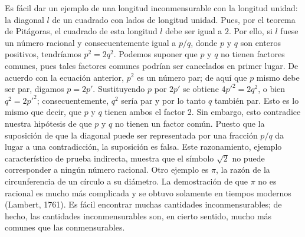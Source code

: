 \documentclass[12pt]{book}
\theoremstyle{definition}
\begin{document}
Es fácil dar un ejemplo de una longitud inconmensurable con la longitud unidad: la diagonal $l$ de un cuadrado con lados de longitud unidad. Pues, por el teorema de Pitágoras, el cuadrado de esta longitud $l$ debe ser igual a $2$. Por ello, si $l$ fuese un número racional y consecuentemente igual a $p/q$, donde $p$ y $q$ son enteros positivos, tendríamos $p^2 = 2q^2$. Podemos suponer que $p$ y $q$ no tienen factores comunes, pues tales factores comunes podrían ser cancelados en primer lugar. De acuerdo con la ecuación anterior, $p^2$ es un número par; de aquí que $p$ mismo debe ser par, digamos $p = 2p'$. Sustituyendo $p$ por $2p'$ se obtiene $4p'^2 = 2q^2$, o bien $q^2 = 2p'^2$; consecuentemente, $q^2$ sería par y por lo tanto $q$ también par. Esto es lo mismo que decir, que $p$ y $q$ tienen ambos el factor $2$. Sin embargo, esto contradice nuestra hipótesis de que $p$ y $q$ no tienen un factor común. Puesto que la suposición de que la diagonal puede ser representada por una fracción $p/q$ da lugar a una contradicción, la suposición es falsa. Este razonamiento, ejemplo característico de prueba indirecta, muestra que el símbolo $\sqrt{2}$ no puede corresponder a ningún número racional. Otro ejemplo es $\pi$, la razón de la circunferencia de un círculo a su diámetro. La demostración de que $\pi$ no es racional es mucho más complicada y se obtuvo solamente en tiempos modernos (Lambert, 1761). Es fácil encontrar muchas cantidades inconmensurables; de hecho, las cantidades inconmensurables son, en cierto sentido, mucho más comunes que las conmensurables.
\end{document}

